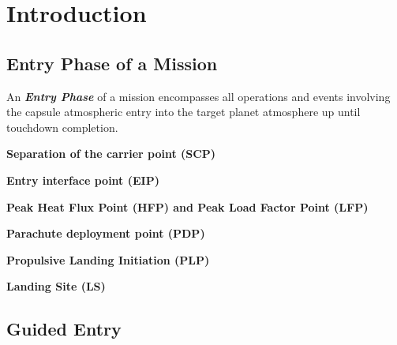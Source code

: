 \chapter{Introduction}

    \section{Entry Phase of a Mission}

        An \textbf{\textit{Entry Phase}} of a mission encompasses all operations and
        events involving the capsule atmospheric entry into the target planet
        atmosphere up until touchdown completion.

        \textbf{Separation of the carrier point (SCP)}

        \textbf{Entry interface point (EIP)}

        \textbf{Peak Heat Flux Point (HFP) and Peak Load Factor Point (LFP)}

        \textbf{Parachute deployment point (PDP)}

        \textbf{Propulsive Landing Initiation (PLP)}

        \textbf{Landing Site (LS)}

    \section{Guided Entry}